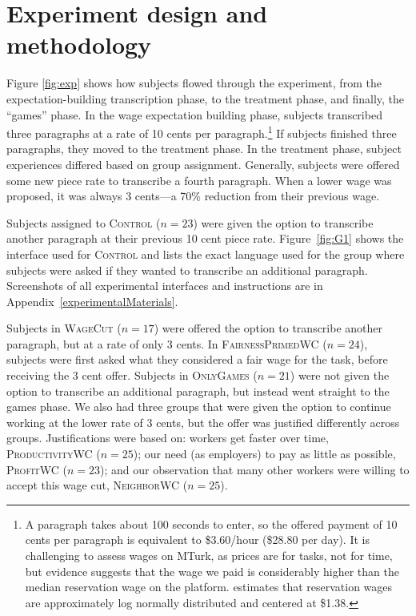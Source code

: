 \documentclass[11pt]{article}
\begin{document}
\section{Experiment design and methodology} 
Figure \ref{fig:exp} shows how subjects flowed through the experiment, from the expectation-building transcription phase, to the treatment phase, and finally, the ``games'' phase. 
In the wage expectation building phase, subjects transcribed three paragraphs at a rate of 10 cents per paragraph.\footnote{ 
  A paragraph takes about 100 seconds to enter, so the offered payment of 10 cents per paragraph is equivalent to \$3.60/hour (\$28.80 per day).
  It is challenging to assess wages on MTurk, as prices are for tasks, not for time, but evidence suggests that the wage we paid is considerably higher than the median reservation wage on the platform.
  \cite{horton2010labor} estimates that reservation wages are approximately log normally distributed and centered at \$1.38. 
}
If subjects finished three paragraphs, they moved to the treatment phase. 
In the treatment phase, subject experiences differed based on group assignment.
Generally, subjects were offered some new piece rate to transcribe a fourth paragraph.
When a lower wage was proposed, it was always 3 cents---a 70\% reduction from their previous wage. 

Subjects assigned to \textsc{Control} ($n = 23$) were given the option to transcribe another paragraph at their previous 10 cent piece rate.
Figure~\ref{fig:G1} shows the interface used for \textsc{Control} and lists the exact language used for the group where subjects were asked if they wanted to transcribe an additional paragraph. 
Screenshots of all experimental interfaces and instructions are in Appendix~\ref{experimentalMaterials}. 

Subjects in \textsc{WageCut} ($n = 17$) were offered the option to transcribe another paragraph, but at a rate of only 3 cents.
In \textsc{FairnessPrimedWC} ($n = 24$), subjects were first asked what they considered a fair wage for the task, before receiving the 3 cent offer. 
Subjects in \textsc{OnlyGames} ($n = 21$) were not given the option to transcribe an additional paragraph, but instead went straight to the games phase.
We also had three groups that were given the option to continue working at the lower rate of 3 cents, but the offer was justified differently across groups.
Justifications were based on:
workers get faster over time, \textsc{ProductivityWC} ($n = 25$);
our need (as employers) to pay as little as possible, \textsc{ProfitWC} ($n = 23$);
and our observation that many other workers were willing to accept this wage cut, \textsc{NeighborWC} ($n = 25$).
\end{document}
